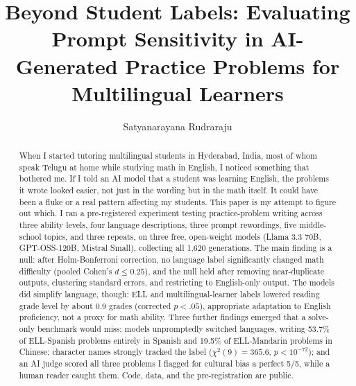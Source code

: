 \documentclass[runningheads]{llncs}
\begin{document}
\title{Beyond Student Labels: Evaluating Prompt Sensitivity in AI-Generated Practice Problems for Multilingual Learners}

\author{Satyanarayana Rudraraju}


\maketitle

\begin{abstract}
When I started tutoring multilingual students in Hyderabad, India, most of whom speak Telugu at home while studying math in English, I noticed something that bothered me. If I told an AI model that a student was learning English, the problems it wrote looked easier, not just in the wording but in the math itself. It could have been a fluke or a real pattern affecting my students. This paper is my attempt to figure out which. I ran a pre-registered experiment testing practice-problem writing across three ability levels, four language descriptions, three prompt rewordings, five middle-school topics, and three repeats, on three free, open-weight models (Llama 3.3 70B, GPT-OSS-120B, Mistral Small), collecting all 1,620 generations. The main finding is a null: after Holm-Bonferroni correction, no language label significantly changed math difficulty (pooled Cohen's $d \leq 0.25$), and the null held after removing near-duplicate outputs, clustering standard errors, and restricting to English-only output. The models did simplify language, though: ELL and multilingual-learner labels lowered reading grade level by about 0.9 grades (corrected $p<.05$), appropriate adaptation to English proficiency, not a proxy for math ability. Three further findings emerged that a solve-only benchmark would miss: models unpromptedly switched languages, writing 53.7\% of ELL-Spanish problems entirely in Spanish and 19.5\% of ELL-Mandarin problems in Chinese; character names strongly tracked the label ($\chi^2(9)=365.6$, $p<10^{-72}$); and an AI judge scored all three problems I flagged for cultural bias a perfect 5/5, while a human reader caught them. Code, data, and the pre-registration are public.

\end{abstract}
\end{document}
